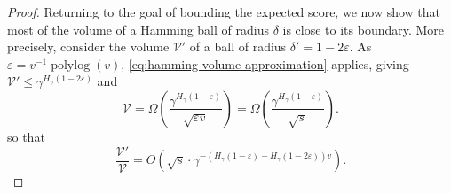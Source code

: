 \documentclass[10pt,a4paper]{article}
\theoremstyle{definition}
\newcommand{\polylog}{\operatorname{polylog}}
\newcommand{\eps}{\varepsilon}
\newcommand{\vcommitlength}{v}
\newcommand{\alphabetsize}{\gamma}
\begin{document}
\begin{proof}
    Returning to the goal of bounding the expected score, we now show that most of the volume of a Hamming ball of radius $\delta$ is close to its boundary. More precisely, consider the volume $\mathcal{V}'$ of a ball of radius $\delta' = 1 - 2\eps$. As $\eps = \vcommitlength^{-1} \polylog(\vcommitlength)$, \cref{eq:hamming-volume-approximation} applies, giving $\mathcal{V}' \leq \alphabetsize^{H_\alphabetsize(1 - 2\eps)}$ and
    \begin{equation*}
        \mathcal{V} = \Omega\left(\frac{\alphabetsize^{H_\alphabetsize(1 - \eps)}}{\sqrt{\eps \vcommitlength}}\right) = \Omega\left(\frac{\alphabetsize^{H_\alphabetsize(1 - \eps)}}{\sqrt{s}}\right).
    \end{equation*}
    so that
    \begin{equation*}
        \frac{\mathcal{V}'}{\mathcal{V}} = O\left(\sqrt{s} \cdot \alphabetsize^{-\left(H_\alphabetsize(1 - \eps) - H_\alphabetsize(1 - 2\eps)\right)\vcommitlength}\right).
    \end{equation*}
    

\end{proof}
\end{document}
